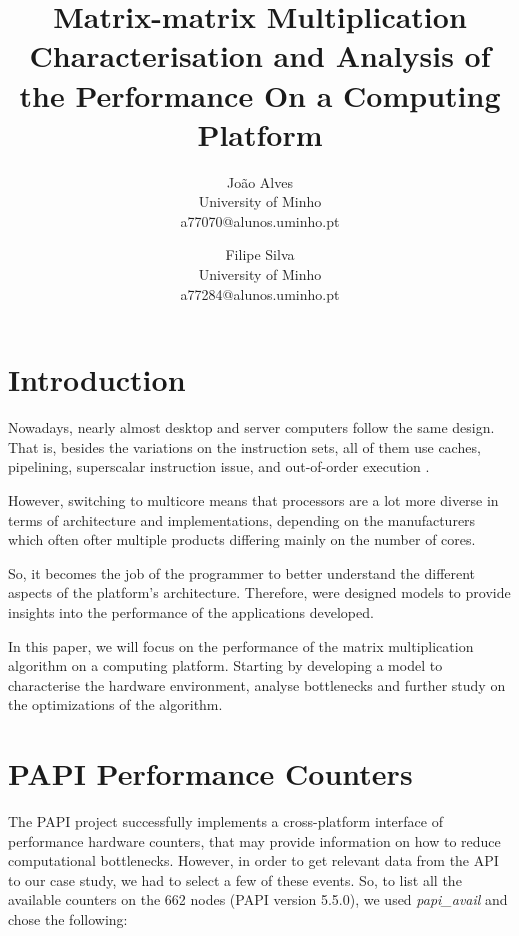 \documentclass[twoside,twocolumn]{article}
\title{Matrix-matrix Multiplication \\
    \large Characterisation and Analysis of the Performance On a Computing Platform} %
\author{
João Alves\\[1ex] %
\normalsize University of Minho \\ %
\normalsize a77070@alunos.uminho.pt %
\and %
Filipe Silva\\[1ex] %
\normalsize University of Minho \\ %
\normalsize a77284@alunos.uminho.pt %
}
\date{} %
\begin{document}
\maketitle


\section{Introduction}

Nowadays, nearly almost desktop and server computers follow the same design. That is, besides the variations on the instruction sets, all of them use caches, pipelining, superscalar instruction issue, and out-of-order execution \cite{roofline}.

However, switching to multicore means that processors are a lot more diverse in terms of architecture and implementations, depending on the manufacturers which often ofter multiple products differing mainly on the number of cores.

So, it becomes the job of the programmer to better understand the different aspects of the platform's architecture. Therefore, were designed models to provide insights into the performance of the applications developed.

In this paper, we will focus on the performance of the matrix multiplication algorithm on a computing platform. Starting by developing a model to characterise the hardware environment, analyse bottlenecks and further study on the optimizations of the algorithm.

%

\section{PAPI Performance Counters}

The PAPI project successfully implements a cross-platform interface of performance hardware counters, that may provide information on how to reduce computational bottlenecks. However, in order to get relevant data from the API to our case study, we had to select a few of these events. So, to list all the available counters on the 662 nodes (PAPI version 5.5.0), we used \emph{papi\_avail} and chose the following:
\end{document}
